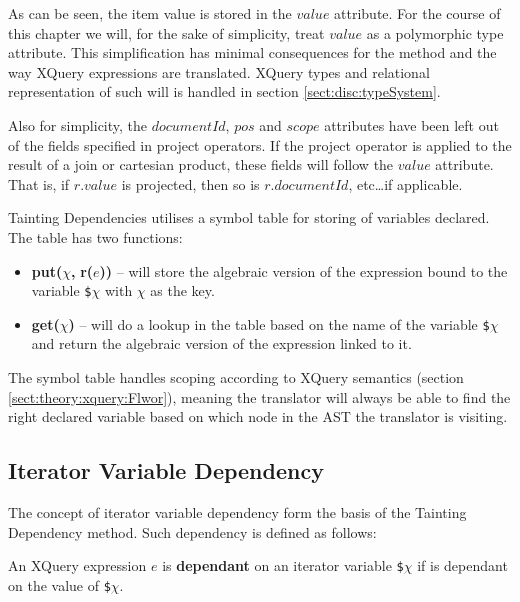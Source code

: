As can be seen, the item value is stored in the $value$ attribute. For the course of this chapter we will, for the
sake of simplicity, treat $value$ as a polymorphic type attribute. This simplification has minimal consequences
for the method and the way XQuery expressions are translated. XQuery types and relational representation of such
will is handled in section \ref{sect:disc:typeSystem}. 

Also for simplicity, the $documentId$, $pos$ and $scope$ attributes have been left out of the
fields specified in \textsf{project} operators. If the \textsf{project} operator is applied to the result of a
join or cartesian product, these fields will follow the $value$ attribute. That is, if $r.value$ is projected,
then so is $r.documentId$, etc\ldots if applicable.

Tainting Dependencies utilises a symbol table for storing of variables declared. The table has two functions:
\begin{itemize}
  \item \textbf{put(}$\chi$\textbf{, }\textbf{r(}$e$\textbf{))} -- will store the
  algebraic version of the expression bound to the variable \texttt{\$}$\chi$ with $\chi$ as the key.  
  \item \textbf{get(}$\chi$\textbf{)} -- will do a lookup in the table based on the name of the variable
  \texttt{\$}$\chi$ and return the algebraic version of the expression linked to it.
\end{itemize}
The symbol table handles scoping according to XQuery semantics (section \ref{sect:theory:xquery:Flwor}), meaning
the translator will always be able to find the right declared variable based on which node in the AST the
translator is visiting.

\subsection{Iterator Variable Dependency}
\label{sect:trans:TD:dependency}

The concept of iterator variable dependency form the basis of the Tainting Dependency method. Such dependency is
defined as follows:
\mbox{} \\
\begin{myDefinition}
An XQuery expression $e$ is \textbf{dependant} on an iterator variable \texttt{\$}$\chi$ if is dependant on the
value of \texttt{\$}$\chi$.
\end{myDefinition}

